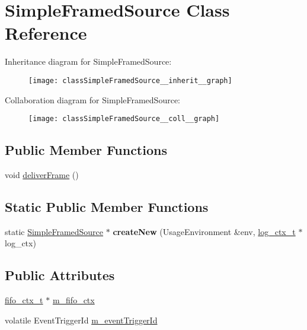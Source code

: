 \hypertarget{classSimpleFramedSource}{}\section{Simple\+Framed\+Source Class Reference}
\label{classSimpleFramedSource}


Inheritance diagram for Simple\+Framed\+Source\+:\nopagebreak
\begin{figure}[H]
\begin{center}
\leavevmode
\texttt{[image: classSimpleFramedSource\_\_inherit\_\_graph]}
\end{center}
\end{figure}


Collaboration diagram for Simple\+Framed\+Source\+:\nopagebreak
\begin{figure}[H]
\begin{center}
\leavevmode
\texttt{[image: classSimpleFramedSource\_\_coll\_\_graph]}
\end{center}
\end{figure}
\subsection*{Public Member Functions}
\begin{DoxyCompactItemize}
\item 
void \hyperlink{classSimpleFramedSource_aeadfcbc8eeb78ada43c9c247e6a707af}{deliver\+Frame} ()
\end{DoxyCompactItemize}
\subsection*{Static Public Member Functions}
\begin{DoxyCompactItemize}
\item 
static \hyperlink{classSimpleFramedSource}{Simple\+Framed\+Source} $\ast$ {\bfseries create\+New} (Usage\+Environment \&env, \hyperlink{structlog__ctx__s}{log\+\_\+ctx\+\_\+t} $\ast$log\+\_\+ctx)\hypertarget{classSimpleFramedSource_a3c02f3f751c4298e6940b3745c9202ad}{}\label{classSimpleFramedSource_a3c02f3f751c4298e6940b3745c9202ad}

\end{DoxyCompactItemize}
\subsection*{Public Attributes}
\begin{DoxyCompactItemize}
\item 
\hyperlink{fifo_8c_acf3f21e64cbabccd8420c306740820c1}{fifo\+\_\+ctx\+\_\+t} $\ast$ \hyperlink{classSimpleFramedSource_ab93999240c393d2d3035dc7e5292eb2c}{m\+\_\+fifo\+\_\+ctx}
\item 
volatile Event\+Trigger\+Id \hyperlink{classSimpleFramedSource_a6de7be242a550522e914316487fa112e}{m\+\_\+event\+Trigger\+Id}
\end{DoxyCompactItemize}
